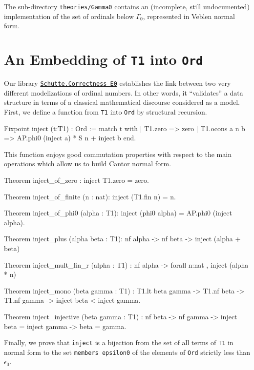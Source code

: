 {\begin{remark}
The sub-directory \href{../theories/html/hydras.Gamma0.html}%
{\texttt{theories/Gamma0}} contains an (incomplete, still undocumented) implementation of the set of ordinals below $\Gamma_0$, represented in Veblen normal form. 
\end{remark}

\section{An Embedding of \texttt{T1} into \texttt{Ord}}


Our library 
\href{../theories/html/hydras.Schutte.correctness_E0.html}%
{\texttt{Schutte.Correctness\_E0}} establishes the link between two very different modelizations of ordinal numbers. In other words, it ``validates'' a data structure in terms of
a classical mathematical discourse considered as a model. 
First, we define a function from \texttt{T1} into  \texttt{Ord} by structural recursion.

\begin{Coqsrc}
Fixpoint inject (t:T1) : Ord :=
 match t with 
     | T1.zero => zero
     | T1.ocons a n b =>  AP.phi0 (inject a) * S n + inject b
 end.  
\end{Coqsrc}

This function enjoys good commutation properties with respect to the main operations which
allow us to build Cantor normal form.

\begin{Coqsrc}
Theorem inject_of_zero : inject T1.zero = zero.

Theorem inject_of_finite (n : nat):
  inject (T1.fin n) =  n.

Theorem inject_of_phi0 (alpha : T1):
  inject (phi0 alpha) = AP.phi0 (inject alpha).

Theorem inject_plus (alpha beta : T1): nf alpha -> nf beta ->
  inject (alpha + beta)%

Theorem inject_mult_fin_r (alpha : T1)  :
  nf alpha -> forall n:nat , inject (alpha *  n)%

Theorem inject_mono (beta gamma : T1) :
  T1.lt  beta gamma -> 
  T1.nf beta -> T1.nf gamma -> 
  inject beta < inject gamma.

Theorem inject_injective (beta gamma : T1) : nf beta -> nf gamma ->
  inject beta = inject gamma -> beta = gamma.
\end{Coqsrc}

Finally, we prove that \texttt{inject} is a bijection from the set of all terms of \texttt{T1} in normal form to the set 
\texttt{members epsilon0} of the elements of \texttt{Ord} strictly less than  $\epsilon_0$.

}
